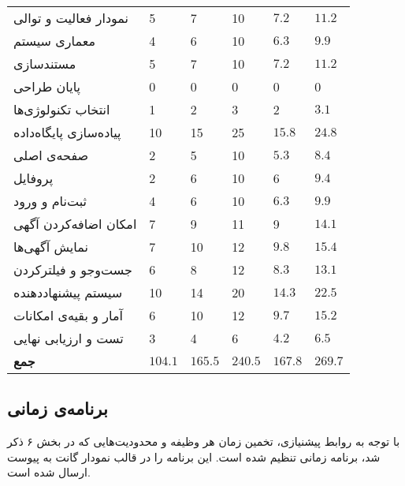 \begin{table}[H]
{\begin{tabular}{|C{0.16666\textwidth}C{0.16666\textwidth}C{0.16666\textwidth}C{0.16666\textwidth}C{0.16666\textwidth}C{0.16666\textwidth}|}
			نمودار فعالیت و توالی & 5 & 7 & 10 & $7.2$ & $11.2$ \\ 
			معماری سیستم & 4 & 6 & 10 & $6.3$ & $9.9$ \\ 
			مستندسازی & 5 & 7 & 10 & $7.2$ & $11.2$ \\ 
			پایان طراحی & 0 & 0 & 0 & 0 & 0 \\ 
			انتخاب تکنولوژی‌ها & 1 & 2 & 3 & 2 & $3.1$ \\ 
			پیاده‌سازی پایگاه‌داده & 10 & 15 & 25 & $15.8$ & $24.8$ \\ 
			صفحه‌ی اصلی & 2 & 5 & 10 &$ 5.3$ & $8.4$ \\ 
			پروفایل & 2 & 6 & 10 & 6 & $9.4$ \\ 
			ثبت‌نام و ورود & 4 & 6 & 10 & $6.3$ & $9.9$ \\ 
			امکان اضافه‌کردن آگهی & 7 & 9 & 11 & 9 & $14.1$ \\ 
			نمایش آگهی‌ها & 7 & 10 & 12 & $9.8$ & $15.4$ \\ 
			جست‌وجو و فیلترکردن & 6 & 8 & 12 & $8.3$ & $13.1$ \\ 
			سیستم پیشنهاددهنده & 10 & 14 & 20 & $14.3$ & $22.5$ \\ 
			آمار و بقیه‌ی امکانات & 6 & 10 & 12 &$ 9.7$ &$ 15.2$ \\ 
			تست و ارزیابی نهایی & 3 & 4 & 6 &$ 4.2$ &$ 6.5$ \\ 
			\textbf{جمع} 
			& \textbf{$104.1$} & \textbf{$165.5$} & \textbf{$240.5$ }& \textbf{$167.8$} & \textbf{$269.7$} \\ 
			\hline
		\end{tabular}
	}
\end{table}

\renewcommand{\arraystretch}{1.7}

\subsection{برنامه‌ی زمانی}
با توجه به روابط پیشنیازی، تخمین زمان هر وظیفه و محدودیت‌هایی که در بخش ۶ ذکر شد، برنامه زمانی تنظیم شده است. این برنامه را در قالب نمودار گانت
به پیوست ارسال شده است.

